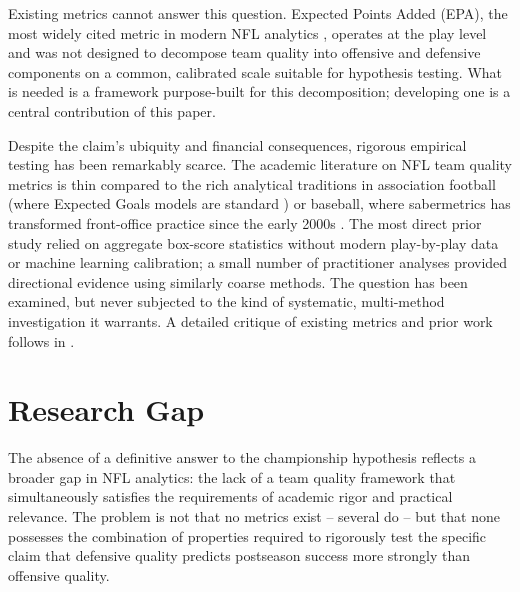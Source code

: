 Existing metrics cannot answer this question. Expected Points Added (EPA), the most widely cited metric in modern NFL analytics \parencite{yurko2019nflwar}, operates at the play level and was not designed to decompose team quality into offensive and defensive components on a common, calibrated scale suitable for hypothesis testing. What is needed is a framework purpose-built for this decomposition; developing one is a central contribution of this paper.

Despite the claim's ubiquity and financial consequences, rigorous empirical testing has been remarkably scarce. The academic literature on NFL team quality metrics is thin compared to the rich analytical traditions in association football (where Expected Goals models are standard \parencite{rathke2017expectedgoals}) or baseball, where sabermetrics has transformed front-office practice since the early 2000s \parencite{lewis2003moneyball}. The most direct prior study \parencite{robst2011defense} relied on aggregate box-score statistics without modern play-by-play data or machine learning calibration; a small number of practitioner analyses \parencite{otten2018defense,mueller2022defense} provided directional evidence using similarly coarse methods. The question has been examined, but never subjected to the kind of systematic, multi-method investigation it warrants. A detailed critique of existing metrics and prior work follows in .


\section{Research Gap}
\label{sec:research-gap}

The absence of a definitive answer to the championship hypothesis reflects a broader gap in NFL analytics: the lack of a team quality framework that simultaneously satisfies the requirements of academic rigor and practical relevance. The problem is not that no metrics exist  -- several do  -- but that none possesses the combination of properties required to rigorously test the specific claim that defensive quality predicts postseason success more strongly than offensive quality.

